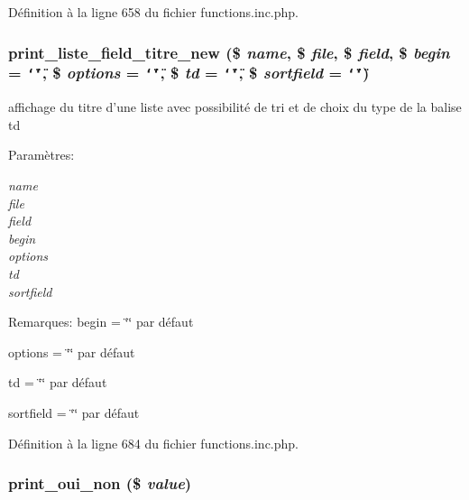 D\'{e}finition \`{a} la ligne 658 du fichier functions.inc.php.\hypertarget{functions_8inc_8php_a27}{
\subsubsection[print\_\-liste\_\-field\_\-titre\_\-new]{\setlength{\rightskip}{0pt plus 5cm}print\_\-liste\_\-field\_\-titre\_\-new (\$ {\em name}, \$ {\em file}, \$ {\em field}, \$ {\em begin} = {\tt \char`\"{}\char`\"{}}, \$ {\em options} = {\tt \char`\"{}\char`\"{}}, \$ {\em td} = {\tt \char`\"{}\char`\"{}}, \$ {\em sortfield} = {\tt \char`\"{}\char`\"{}})}}
\label{functions_8inc_8php_a27}


affichage du titre d'une liste avec possibilit\'{e} de tri et de choix du type de la balise td 

\begin{Desc}
\item[Param\`{e}tres:]
\begin{description}
\item[{\em name}]\item[{\em file}]\item[{\em field}]\item[{\em begin}]\item[{\em options}]\item[{\em td}]\item[{\em sortfield}]\end{description}
\end{Desc}
\begin{Desc}
\item[Remarques:]begin = \char`\"{}\char`\"{} par d\'{e}faut 

options = \char`\"{}\char`\"{} par d\'{e}faut 

td = \char`\"{}\char`\"{} par d\'{e}faut 

sortfield = \char`\"{}\char`\"{} par d\'{e}faut \end{Desc}


D\'{e}finition \`{a} la ligne 684 du fichier functions.inc.php.\hypertarget{functions_8inc_8php_a34}{
\subsubsection[print\_\-oui\_\-non]{\setlength{\rightskip}{0pt plus 5cm}print\_\-oui\_\-non (\$ {\em value})}}
\label{functions_8inc_8php_a34}


